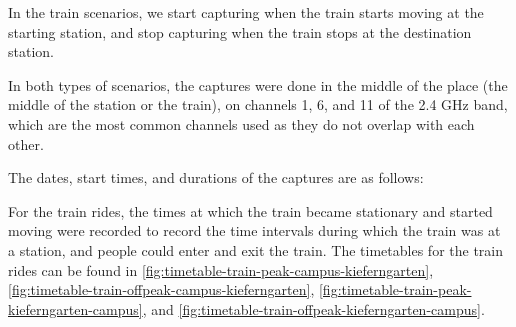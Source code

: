 \documentclass[sigconf,nonacm]{acmart}
\begin{document}
In the train scenarios, we start capturing when the train starts moving at the starting station, and stop capturing when the train stops at the destination station.

In both types of scenarios, the captures were done in the middle of the place (the middle of the station or the train), on channels 1, 6, and 11 of the 2.4 GHz band, which are the most common channels used as they do not overlap with each other.

The dates, start times, and durations of the captures are as follows:
\begin{table}[ht]
\centering
\caption{Capture dates, start times, and durations for each scenario}
\label{tab:capture_times}
\end{table}

For the train rides, the times at which the train became stationary and started moving were recorded to record the time intervals during which the train was at a station, and people could enter and exit the train. The timetables for the train rides can be found in \cref{fig:timetable-train-peak-campus-kieferngarten}, \cref{fig:timetable-train-offpeak-campus-kieferngarten}, \cref{fig:timetable-train-peak-kieferngarten-campus}, and \cref{fig:timetable-train-offpeak-kieferngarten-campus}.
\end{document}
